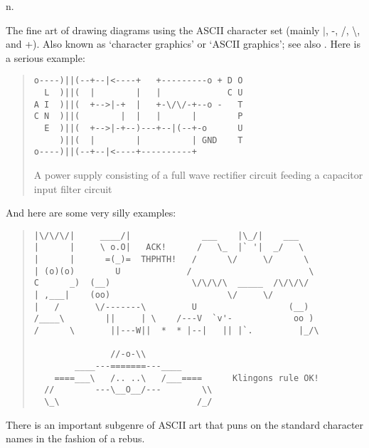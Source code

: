  n.

The fine art of drawing diagrams using the ASCII character set (mainly
$\left|\right.$, -, /, \textbackslash, and +). Also known as `character
graphics' or `ASCII graphics'; see also . Here is a serious
example:

\begin{figure*}
    \begin{quote}
        \begin{verbatim}
o----)||(--+--|<----+   +---------o + D O
  L  )||(  |        |   |             C U
A I  )||(  +-->|-+  |   +-\/\/-+--o -   T
C N  )||(        |  |   |      |        P
  E  )||(  +-->|-+--)---+--|(--+-o      U
     )||(  |        |          | GND    T
o----)||(--+--|<----+----------+
        \end{verbatim}

        A power supply consisting of a full wave rectifier circuit feeding a
        capacitor input filter circuit
    \end{quote}
\end{figure*}

And here are some very silly examples:

\begin{figure*}
    \begin{quote}
        \begin{verbatim}
|\/\/\/|     ____/|              ___    |\_/|    ___
|      |     \ o.O|   ACK!      /   \_  |` '|  _/   \
|      |      =(_)=  THPHTH!   /      \/     \/      \
| (o)(o)        U             /                       \
C      _)  (__)                \/\/\/\  _____  /\/\/\/
| ,___|    (oo)                       \/     \/
|   /       \/-------\         U                  (__)
/____\        ||     | \    /---V  `v'-            oo )
/      \       ||---W||  *  * |--|   || |`.         |_/\

               //-o-\\
        ____---=======---____
    ====___\   /.. ..\   /___====      Klingons rule OK!
  //        ---\__O__/---        \\
  \_\                           /_/
        \end{verbatim}
    \end{quote}
\end{figure*}

There is an important subgenre of ASCII art that puns on the standard character
names in the fashion of a rebus.

